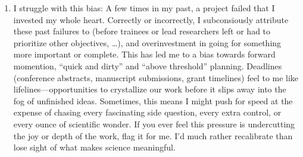 \documentclass[letterpaper,10pt,english]{sphinxmanual}
\begin{document}
\begin{enumerate}
%
\setcounter{enumi}{6}
\item {} 
\sphinxAtStartPar
I struggle with this bias: A few times in my past, a project failed that I invested my whole heart. Correctly or incorrectly, I subconsiously attribute these past failures to  (before trainees or lead researchers left or had to prioritize other objectives, …), and over\sphinxhyphen{}investment in going for something more important or complete. This has led me to a bias towards forward momention, “quick and dirty” and “above threshold” planning. Deadlines (conference abstracts, manuscript submissions, grant timelines) feel to me like lifelines—opportunities to crystallize our work before it slips away into the fog of unfinished ideas. Sometimes, this means I might push for speed at the expense of chasing every fascinating side question, every extra control, or every ounce of scientific wonder. If you ever feel this pressure is undercutting the joy or depth of the work, flag it for me. I’d much rather recalibrate than lose sight of what makes science meaningful. 

\end{enumerate}
\end{document}
